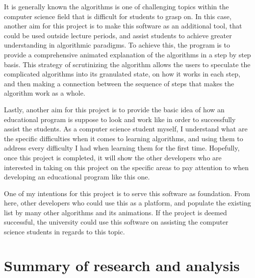It is generally known the algorithms is one of challenging topics within the computer science field that is difficult for students to grasp on. In this case, another aim for this project is to make this software as an additional tool, that could be used outside lecture periods, and assist students to achieve greater understanding in algorithmic paradigms. To achieve this, the program is to provide a comprehensive animated explanation of the algorithms in a step by step basis. This strategy of scrutinizing the algorithm allows the users to speculate the complicated algorithms into its granulated state, on how it works in each step, and then making a connection between the sequence of steps that makes the algorithm work as a whole.

Lastly, another aim for this project is to provide the basic idea of how an educational program is suppose to look and work like in order to successfully assist the students. As a computer science student myself, I understand what are the specific difficulties when it comes to learning algorithms, and using them to address every difficulty I had when learning them for the first time. Hopefully, once this project is completed, it will show the other developers who are interested in taking on this project on the specific areas to pay attention to when developing an educational program like this one. 

One of my intentions for this project is to serve this software as foundation. From here, other developers who could use this as a platform, and populate the existing list by many other algorithms and its animations. If the project is deemed successful, the university could use this software on assisting the computer science students in regards to this topic. 


\section{Summary of research and analysis}

